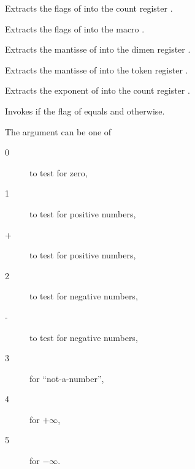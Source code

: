 \begin{command}{}
	Extracts the flags of  into the count register .
\end{command}

\begin{command}{}
	Extracts the flags of  into the macro .
\end{command}

\begin{command}{}
	Extracts the mantisse of  into the dimen register .
\end{command}
\begin{command}{}
	Extracts the mantisse of  into the token register .
\end{command}
\begin{command}{}
	Extracts the exponent of  into the count register .
\end{command}

\begin{command}{\pgfmathfloatifflags{}}
	Invokes  if the flag of  equals  and  otherwise.

	The argument  can be one of
	\begin{description}
		\item[0] to test for zero,
		\item[1] to test for positive numbers,
		\item[+] to test for positive numbers,
		\item[2] to test for negative numbers,
		\item[-] to test for negative numbers,
		\item[3] for ``not-a-number'',
		\item[4] for $+\infty$,
		\item[5] for $-\infty$.
	\end{description}
	
\begin{codeexample}[]

\end{codeexample}
\end{command}


